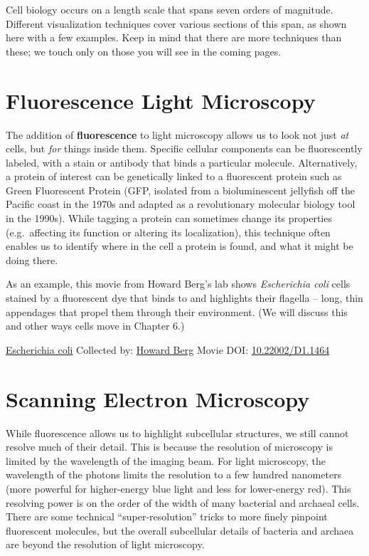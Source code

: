 \documentclass[]{tufte-book}
\begin{document}
Cell biology occurs on a length scale that spans seven orders of magnitude. Different visualization techniques cover various sections of this span, as shown here with a few examples. Keep in mind that there are more techniques than these; we touch only on those you will see in the coming pages.

\hypertarget{fluorescence-light-microscopy}{%
\section{Fluorescence Light Microscopy}\label{fluorescence-light-microscopy}}

The addition of \textbf{fluorescence} to light microscopy allows us to look not just \emph{at} cells, but \emph{for} things inside them. Specific cellular components can be fluorescently labeled, with a stain or antibody that binds a particular molecule. Alternatively, a protein of interest can be genetically linked to a fluorescent protein such as Green Fluorescent Protein (GFP, isolated from a bioluminescent jellyfish off the Pacific coast in the 1970s and adapted as a revolutionary molecular biology tool in the 1990s). While tagging a protein can sometimes change its properties (e.g.~affecting its function or altering its localization), this technique often enables us to identify where in the cell a protein is found, and what it might be doing there.

As an example, this movie from Howard Berg's lab \citep{bergInternet} \citep{turner2000} shows \emph{Escherichia coli} cells stained by a fluorescent dye that binds to and highlights their flagella -- long, thin appendages that propel them through their environment. (We will discuss this and other ways cells move in Chapter 6.)



\hypertarget{htmlwidget-42be5f762d40315cfd4d}{}

\label{fig:1-2}\protect\hyperlink{tree}{Escherichia coli} Collected by: \protect\hyperlink{howard_berg}{Howard Berg} Movie DOI: \href{https://doi.org/10.22002/D1.1464}{10.22002/D1.1464}

\hypertarget{scanning-electron-microscopy}{%
\section{Scanning Electron Microscopy}\label{scanning-electron-microscopy}}

While fluorescence allows us to highlight subcellular structures, we still cannot resolve much of their detail. This is because the resolution of microscopy is limited by the wavelength of the imaging beam. For light microscopy, the wavelength of the photons limits the resolution to a few hundred nanometers (more powerful for higher-energy blue light and less for lower-energy red). This resolving power is on the order of the width of many bacterial and archaeal cells. There are some technical ``super-resolution'' tricks to more finely pinpoint fluorescent molecules, but the overall subcellular details of bacteria and archaea are beyond the resolution of light microscopy.
\end{document}
